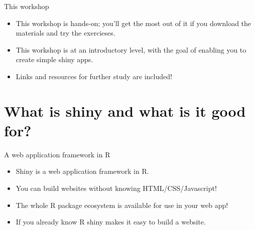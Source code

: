 \documentclass[
  12pt,
  ignorenonframetext,
]{beamer}
\providecommand{\tightlist}{%
  \setlength{\itemsep}{0pt}\setlength{\parskip}{0pt}}
\begin{document}
\begin{frame}{This workshop}
\protect\hypertarget{this-workshop}{}

\begin{itemize}[<+->]
\tightlist
\item
  This workshop is hands-on; you'll get the most out of it if you
  download the materials and try the exercieses.
\end{itemize}

\begin{itemize}[<+->]
\tightlist
\item
  This workshop is at an introductory level, with the goal of enabling
  you to create simple shiny apps.
\end{itemize}

\begin{itemize}[<+->]
\tightlist
\item
  Links and resources for further study are included!
\end{itemize}

\end{frame}

\hypertarget{what-is-shiny-and-what-is-it-good-for}{%
\section{What is shiny and what is it good
for?}\label{what-is-shiny-and-what-is-it-good-for}}

\begin{frame}{A web application framework in R}
\protect\hypertarget{a-web-application-framework-in-r}{}

\begin{itemize}[<+->]
\tightlist
\item
  Shiny is a web application framework in R.
\end{itemize}

\begin{itemize}[<+->]
\tightlist
\item
  You can build websites without knowing HTML/CSS/Javascript!
\end{itemize}

\begin{itemize}[<+->]
\tightlist
\item
  The whole R package ecosystem is available for use in your web app!
\end{itemize}

\begin{itemize}[<+->]
\tightlist
\item
  If you already know R shiny makes it easy to build a website.
\end{itemize}

\end{frame}
\end{document}
